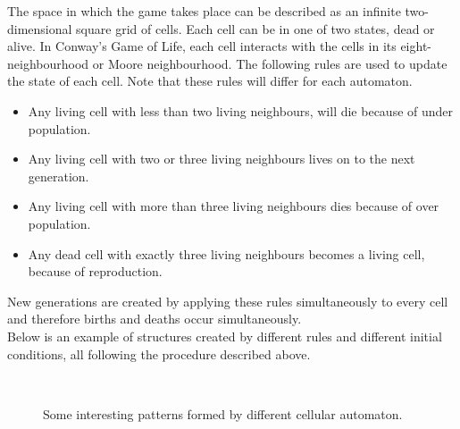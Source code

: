 \documentclass[a4paper,10pt]{article}
\begin{document}
The  space in  which the  game  takes place  can  be described  as an  infinite
two-dimensional square grid of cells.  Each cell can
be in one of two states, dead  or alive.  In Conway's Game of Life, each
cell   interacts  with   the  cells   in  its   eight-neighbourhood  or   Moore
neighbourhood.  The following  rules are used to update the state of each cell.
Note that these rules will differ for each automaton.

\begin{itemize}
 \item  Any living cell with less than two living neighbours, will die because of under population.
 \item Any living cell with two or three living neighbours lives on to the next generation.
 \item Any living cell with more than three living neighbours dies because of over population.
 \item Any dead cell with exactly three living neighbours becomes a living cell, because of reproduction.
\end{itemize}

New generations are created by applying these rules simultaneously to every cell and therefore births and deaths occur simultaneously. \\

Below is an example of structures created by
different rules and different initial conditions, all following the procedure described above. \\

\begin{figure}[H]
\centering
\mbox{ \quad
{}}
\caption{Some interesting patterns formed by different cellular automaton\cite{conway}.}
\end{figure}
\end{document}
